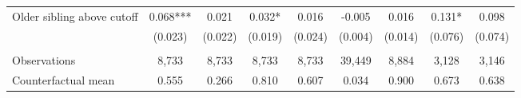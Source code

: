 {{\begin{tabular}{lcccccccc}
Older sibling above cutoff&       0.068***&       0.021   &       0.032*  &       0.016   &      -0.005   &       0.016   &       0.131*  &       0.098   \\
                    &     (0.023)   &     (0.022)   &     (0.019)   &     (0.024)   &     (0.004)   &     (0.014)   &     (0.076)   &     (0.074)   \\
                    &               &               &               &               &               &               &               &               \\
Observations        &       8,733   &       8,733   &       8,733   &       8,733   &      39,449   &       8,884   &       3,128   &       3,146   \\
Counterfactual mean &       0.555   &       0.266   &       0.810   &       0.607   &       0.034   &       0.900   &       0.673   &       0.638   \\
 

\bottomrule
\end{tabular}
}
}
